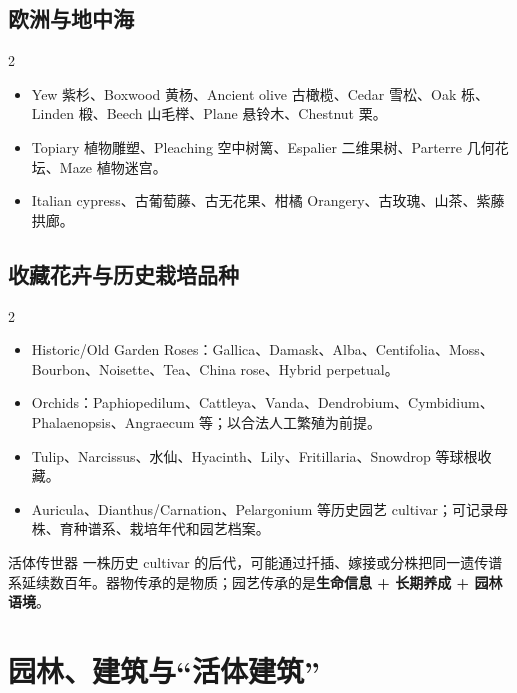 \documentclass[lang=en,a4paper,11pt]{elegantpaper}
\begin{document}
\subsection{欧洲与地中海}


\begin{multicols}{2}
\begin{itemize}
\item Yew 紫杉、Boxwood 黄杨、Ancient olive 古橄榄、Cedar 雪松、Oak 栎、Linden 椴、Beech 山毛榉、Plane 悬铃木、Chestnut 栗。
\item Topiary 植物雕塑、Pleaching 空中树篱、Espalier 二维果树、Parterre 几何花坛、Maze 植物迷宫。
\item Italian cypress、古葡萄藤、古无花果、柑橘 Orangery、古玫瑰、山茶、紫藤拱廊。
\end{itemize}
\end{multicols}

\subsection{收藏花卉与历史栽培品种}


\begin{multicols}{2}
\begin{itemize}
\item Historic/Old Garden Roses：Gallica、Damask、Alba、Centifolia、Moss、Bourbon、Noisette、Tea、China rose、Hybrid perpetual。
\item Orchids：Paphiopedilum、Cattleya、Vanda、Dendrobium、Cymbidium、Phalaenopsis、Angraecum 等；以合法人工繁殖为前提。
\item Tulip、Narcissus、水仙、Hyacinth、Lily、Fritillaria、Snowdrop 等球根收藏。
\item Auricula、Dianthus/Carnation、Pelargonium 等历史园艺 cultivar；可记录母株、育种谱系、栽培年代和园艺档案。
\end{itemize}
\end{multicols}

\begin{designbox}{活体传世器}
一株历史 cultivar 的后代，可能通过扦插、嫁接或分株把同一遗传谱系延续数百年。器物传承的是物质；园艺传承的是\textbf{生命信息 + 长期养成 + 园林语境}。
\end{designbox}

\section{园林、建筑与“活体建筑”}
\end{document}
